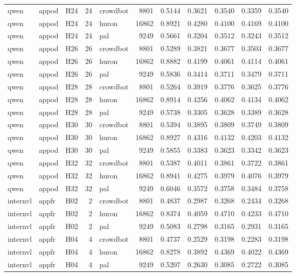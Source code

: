 \begin{table}[tbp]
\begin{tabular}{lllrlrrrrrr}
qwen & appod & H24 & 24 & crowdbot & 8801 & 0.5144 & 0.3621 & 0.3540 & 0.3359 & 0.3540 \\
qwen & appod & H24 & 24 & huron & 16862 & 0.8921 & 0.4280 & 0.4100 & 0.4169 & 0.4100 \\
qwen & appod & H24 & 24 & pal & 9249 & 0.5661 & 0.3204 & 0.3512 & 0.3243 & 0.3512 \\
qwen & appod & H26 & 26 & crowdbot & 8801 & 0.5289 & 0.3821 & 0.3677 & 0.3503 & 0.3677 \\
qwen & appod & H26 & 26 & huron & 16862 & 0.8882 & 0.4199 & 0.4061 & 0.4114 & 0.4061 \\
qwen & appod & H26 & 26 & pal & 9249 & 0.5836 & 0.3414 & 0.3711 & 0.3479 & 0.3711 \\
qwen & appod & H28 & 28 & crowdbot & 8801 & 0.5264 & 0.3919 & 0.3776 & 0.3625 & 0.3776 \\
qwen & appod & H28 & 28 & huron & 16862 & 0.8914 & 0.4256 & 0.4062 & 0.4134 & 0.4062 \\
qwen & appod & H28 & 28 & pal & 9249 & 0.5738 & 0.3305 & 0.3628 & 0.3389 & 0.3628 \\
qwen & appod & H30 & 30 & crowdbot & 8801 & 0.5394 & 0.3895 & 0.3809 & 0.3749 & 0.3809 \\
qwen & appod & H30 & 30 & huron & 16862 & 0.8927 & 0.4316 & 0.4132 & 0.4203 & 0.4132 \\
qwen & appod & H30 & 30 & pal & 9249 & 0.5855 & 0.3383 & 0.3623 & 0.3342 & 0.3623 \\
qwen & appod & H32 & 32 & crowdbot & 8801 & 0.5387 & 0.4011 & 0.3861 & 0.3722 & 0.3861 \\
qwen & appod & H32 & 32 & huron & 16862 & 0.8941 & 0.4275 & 0.3979 & 0.4076 & 0.3979 \\
qwen & appod & H32 & 32 & pal & 9249 & 0.6046 & 0.3572 & 0.3758 & 0.3484 & 0.3758 \\
internvl & appfr & H02 & 2 & crowdbot & 8801 & 0.4837 & 0.2987 & 0.3268 & 0.2434 & 0.3268 \\
internvl & appfr & H02 & 2 & huron & 16862 & 0.8374 & 0.4059 & 0.4710 & 0.4233 & 0.4710 \\
internvl & appfr & H02 & 2 & pal & 9249 & 0.5083 & 0.2798 & 0.3165 & 0.2931 & 0.3165 \\
internvl & appfr & H04 & 4 & crowdbot & 8801 & 0.4737 & 0.2529 & 0.3198 & 0.2283 & 0.3198 \\
internvl & appfr & H04 & 4 & huron & 16862 & 0.8278 & 0.3892 & 0.4369 & 0.4022 & 0.4369 \\
internvl & appfr & H04 & 4 & pal & 9249 & 0.5207 & 0.2630 & 0.3085 & 0.2722 & 0.3085 \\

\end{tabular}
\end{table}
